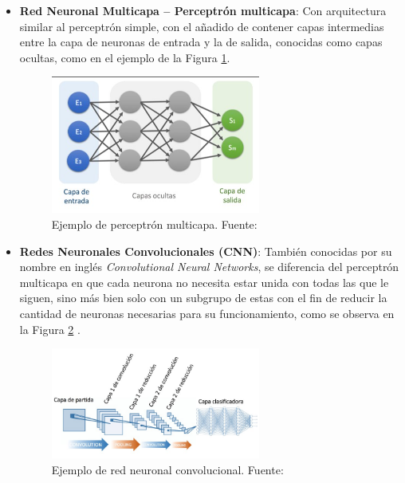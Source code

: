 \begin{itemize}
\begin{itemize}
		\item \textbf{Red Neuronal Multicapa – Perceptrón multicapa}: Con arquitectura similar al perceptrón simple, con el añadido de contener capas intermedias entre la capa de neuronas de entrada y la de salida, conocidas como capas ocultas, como en el ejemplo de la Figura \ref{2:fig22}.
		\begin{figure}[h]
			\begin{center}
				\includegraphics[width=0.65\textwidth]{2/figures/perceptron_multicapa.jpg}
				\caption{Ejemplo de perceptrón multicapa. Fuente: \cite{gl_calvo2017clasifrna}}
				\label{2:fig22}
			\end{center}
		\end{figure}
		
		\item \textbf{Redes Neuronales Convolucionales (CNN)}: También conocidas por su nombre en inglés \textit{Convolutional Neural Networks}, se diferencia del perceptrón multicapa en que cada neurona no necesita estar unida con todas las que le siguen, sino más bien solo con un subgrupo de estas con el fin de reducir la cantidad de neuronas necesarias para su funcionamiento, como se observa en la Figura \ref{2:fig23} \parencite{gl_calvo2017clasifrna}.
		\begin{figure}[h]
			\begin{center}
				\includegraphics[width=0.65\textwidth]{2/figures/cnn.jpg}
				\caption{Ejemplo de red neuronal convolucional. Fuente: \cite{gl_calvo2017clasifrna}}
				\label{2:fig23}
			\end{center}
		\end{figure}
		

\end{itemize}
\end{itemize}
